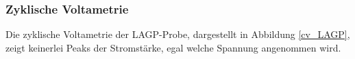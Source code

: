 \documentclass[a4paper, 11pt, headsepline,footsepline,twoside,abstract]{scrbook}
\begin{document}
\subsubsection{Zyklische Voltametrie}
Die zyklische Voltametrie der LAGP-Probe, dargestellt in Abbildung \ref{cv_LAGP}, zeigt keinerlei Peaks der Stromstärke, egal welche Spannung angenommen wird.
\end{document}
